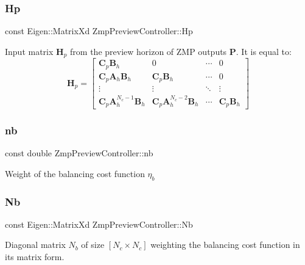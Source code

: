 \subsubsection{\texorpdfstring{Hp}{Hp}}
{\footnotesize\ttfamily const Eigen\+::\+Matrix\+Xd Zmp\+Preview\+Controller\+::\+Hp\hspace{0.3cm}{\ttfamily [private]}}

Input matrix $\mathbf{H}_p$ from the preview horizon of Z\+MP outputs $\mathbf{P}$. It is equal to\+: \[ \mathbf{H}_p = \left[\begin{array}{cccc} \mathbf{C}_p\mathbf{B}_h & 0 & \cdots & 0 \\ \mathbf{C}_p\mathbf{A}_h\mathbf{B}_h & \mathbf{C}_p\mathbf{B}_h & \cdots & 0 \\ \vdots & \vdots & \ddots & \vdots \\ \mathbf{C}_p\mathbf{A}^{N_c-1}_h\mathbf{B}_h & \mathbf{C}_p\mathbf{A}^{N_c-2}_h\mathbf{B}_h & \cdots & \mathbf{C}_p\mathbf{B}_h \end{array}\right] \] \hypertarget{classZmpPreviewController_a6716ee4c94e6f91e608ee1e29fbc7051}{}\label{classZmpPreviewController_a6716ee4c94e6f91e608ee1e29fbc7051} 
\subsubsection{\texorpdfstring{nb}{nb}}
{\footnotesize\ttfamily const double Zmp\+Preview\+Controller\+::nb\hspace{0.3cm}{\ttfamily [private]}}

Weight of the balancing cost function $ \eta_b $ \hypertarget{classZmpPreviewController_abd345d397e99ae01ad4ea80cd9894802}{}\label{classZmpPreviewController_abd345d397e99ae01ad4ea80cd9894802} 
\subsubsection{\texorpdfstring{Nb}{Nb}}
{\footnotesize\ttfamily const Eigen\+::\+Matrix\+Xd Zmp\+Preview\+Controller\+::\+Nb\hspace{0.3cm}{\ttfamily [private]}}

Diagonal matrix $N_b$ of size $[N_c \times N_c]$ weighting the balancing cost function in its matrix form. \hypertarget{classZmpPreviewController_a43e471820b285c89e9d1878448a6f364}{}\label{classZmpPreviewController_a43e471820b285c89e9d1878448a6f364} 

